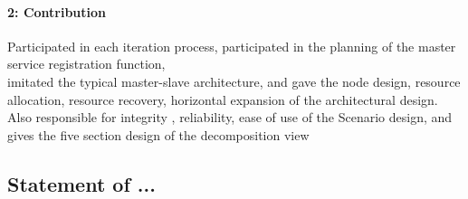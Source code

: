 \documentclass{article}
\begin{document}
	\paragraph{2: Contribution}
	Participated in each iteration process, participated in the planning of the master service registration function, \\
	imitated the typical master-slave architecture, and gave the node design, resource allocation, resource recovery, horizontal expansion of the architectural design. \\
	Also responsible for integrity , reliability, ease of use of the Scenario design, and gives the five section design of the decomposition view\\

	\subsection{Statement of ...}
\end{document}
